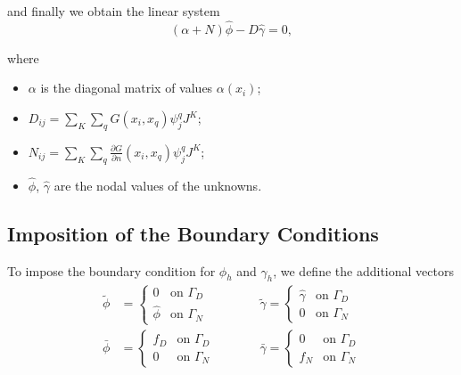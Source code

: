and finally we obtain the linear system
\begin{equation}
\label{eq:first-LS}
(\alpha+N)\hat{\phi}-D\hat{\gamma}=0,
\end{equation}

where
\begin{itemize}
\item $\alpha$ is the diagonal matrix of values $\alpha(x_i)$;
\item $D_{ij}=\sum_K \sum_q G(x_i,x_q)\psi_j^q J^K$;
\item $N_{ij}=\sum_K \sum_q \frac{\partial G}{\partial n}(x_i,x_q)\psi_j^q J^K$;
\item $\hat{\phi}$, $\hat{\gamma}$ are the nodal values of the unknowns.
\end{itemize}

\subsection{Imposition of the Boundary Conditions}
\label{sub:imposition_of_the_boundary_conditions}

To impose the boundary condition for $\phi_h$ and $\gamma_h$, we define the additional vectors
\begin{subequations}
\label{eq:bc-LS}
\begin{align}
\label{eq:bc-LS1}
\tilde{\phi} &= 
\begin{cases}
0 & \text{on } \Gamma_D \\
\hat{\phi} & \text{on } \Gamma_N
\end{cases} \qquad &&
\tilde{\gamma} = 
\begin{cases}
\hat{\gamma} & \text{on } \Gamma_D \\
0 & \text{on }  \Gamma_N
\end{cases} \\
\label{eq:bc-LS2}
\bar{\phi} &= 
\begin{cases}
f_D & \text{on }  \Gamma_D \\
0 & \text{on }  \Gamma_N
\end{cases} \qquad &&
\bar{\gamma} = 
\begin{cases}
0 & \text{on }  \Gamma_D \\
f_N & \text{on } \Gamma_N
\end{cases}
\end{align}
\end{subequations}

